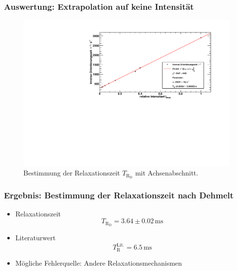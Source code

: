 \begin{frame}
\frametitle{Auswertung: Extrapolation auf keine Intensität}
\begin{figure}
    \begin{center}
        \includegraphics[width=\textwidth]{../img/taufit.pdf}
        \caption{Bestimmung der Relaxationszeit $T_{\text{R}_\text{D}}$ mit Achsenabschnitt.}
    \end{center}
\end{figure}
\end{frame}

\begin{frame}
\frametitle{Ergebnis: Bestimmung der Relaxationszeit nach Dehmelt}
\begin{itemize}[<+->]
    \item Relaxationszeit
    \begin{equation*}
        T_{\text{R}_\text{D}} = 3.64 \pm 0.02\,\text{ms}
    \end{equation*}
    \item Literaturwert
    \begin{equation*}
        T_{\text{R}}^\text{Lit.} = 6.5\,\text{ms}
    \end{equation*}
    \item Mögliche Fehlerquelle: Andere Relaxationsmechanismen
\end{itemize}
\end{frame}